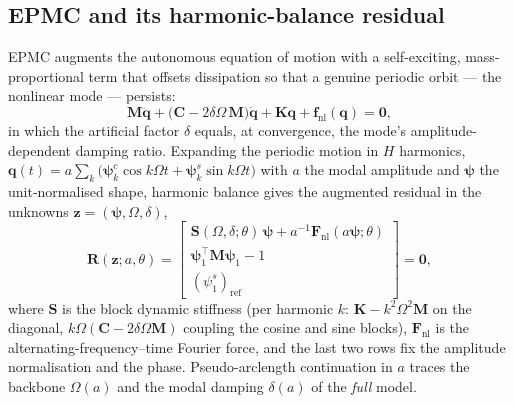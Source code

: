 \documentclass[11pt]{article}
\begin{document}
\subsection{EPMC and its harmonic-balance residual}
EPMC augments the autonomous equation of motion with a self-exciting,
mass-proportional term that offsets dissipation so that a genuine periodic orbit
--- the nonlinear mode --- persists:
\begin{equation}
\bm M\ddot{\bm q}+\big(\bm C-2\delta\Omega\,\bm M\big)\dot{\bm q}
+\bm K\bm q+\bm f_{\mathrm{nl}}(\bm q)=\bm 0 ,
\label{eq:epmc-eom}
\end{equation}
in which the artificial factor $\delta$ equals, at convergence, the mode's
amplitude-dependent damping ratio. Expanding the periodic motion in $H$ harmonics,
$\bm q(t)=a\sum_{k}\big(\bm\psi^{c}_{k}\cos k\Omega t+\bm\psi^{s}_{k}\sin k\Omega t\big)$
with $a$ the modal amplitude and $\bm\psi$ the unit-normalised shape, harmonic
balance gives the augmented residual in the unknowns $\bm z=(\bm\psi,\Omega,\delta)$,
\begin{equation}
\bm R(\bm z;a,\theta)=
\begin{bmatrix}
\bm S(\Omega,\delta;\theta)\,\bm\psi+a^{-1}\bm F_{\mathrm{nl}}(a\bm\psi;\theta)\\[2pt]
\bm\psi_1^{\!\top}\bm M\bm\psi_1-1\\[2pt]
(\psi^{s}_{1})_{\mathrm{ref}}
\end{bmatrix}=\bm 0,
\label{eq:epmc-res}
\end{equation}
where $\bm S$ is the block dynamic stiffness (per harmonic $k$: $\bm K-k^2\Omega^2\bm M$
on the diagonal, $k\Omega(\bm C-2\delta\Omega\bm M)$ coupling the cosine and sine
blocks), $\bm F_{\mathrm{nl}}$ is the alternating-frequency--time Fourier force, and
the last two rows fix the amplitude normalisation and the phase. Pseudo-arclength
continuation in $a$ traces the backbone $\Omega(a)$ and the modal damping $\delta(a)$
of the \emph{full} model.
\end{document}
